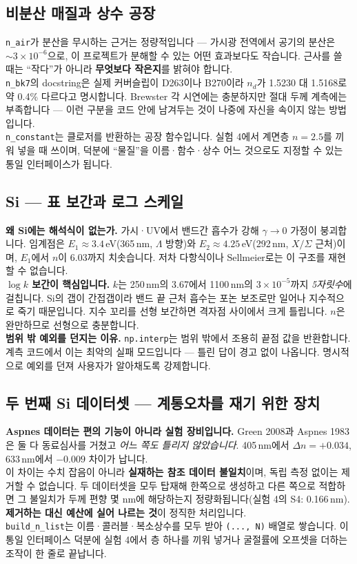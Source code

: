 \documentclass[10pt,a4paper]{article}
\newcommand{\note}[1]{%
  \begin{tcolorbox}[enhanced,breakable,colback=white,colframe=accent,
    boxrule=0pt,leftrule=1.6pt,arc=0pt,outer arc=0pt,
    left=6pt,right=2pt,top=3pt,bottom=3pt,boxsep=0pt,
    before skip=5pt, after skip=8pt]
  #1
  \end{tcolorbox}}
\begin{document}
\subsection{비분산 매질과 상수 공장}

\note{
\texttt{n\_air}가 분산을 무시하는 근거는 정량적입니다 — 가시광 전역에서 공기의 분산은
$\sim3\times10^{-6}$으로, 이 프로젝트가 분해할 수 있는 어떤 효과보다도 작습니다.
근사를 쓸 때는 ``작다''가 아니라 \textbf{무엇보다 작은지}를 밝혀야 합니다.\\[4pt]
\texttt{n\_bk7}의 docstring은 실제 커버슬립이 D263이나 B270이라 $n_d$가 1.5230 대 1.5168로
약 0.4\% 다르다고 명시합니다. Brewster 각 시연에는 충분하지만 절대 두께 계측에는 부족합니다 —
이런 구분을 코드 안에 남겨두는 것이 나중에 자신을 속이지 않는 방법입니다.\\[4pt]
\texttt{n\_constant}는 클로저를 반환하는 공장 함수입니다. 실험 4에서 계면층
$n=2.5$를 끼워 넣을 때 쓰이며, 덕분에 ``물질''을 이름·함수·상수 어느 것으로도
지정할 수 있는 통일 인터페이스가 됩니다.
}
\subsection{Si — 표 보간과 로그 스케일}

\note{
\textbf{왜 Si에는 해석식이 없는가.} 가시·UV에서 밴드간 흡수가 강해 $\gamma\to0$ 가정이
붕괴합니다. 임계점은 $E_1\approx3.4$\,eV(365\,nm, $\Lambda$ 방향)와
$E_2\approx4.25$\,eV(292\,nm, $X/\Sigma$ 근처)이며, $E_1$에서 $n$이 6.03까지 치솟습니다.
저차 다항식이나 Sellmeier로는 이 구조를 재현할 수 없습니다.\\[4pt]
\textbf{$\log k$ 보간이 핵심입니다.} $k$는 250\,nm의 3.67에서 1100\,nm의 $3\times10^{-5}$까지
\emph{5자릿수}에 걸칩니다. Si의 갭이 간접갭이라 밴드 끝 근처 흡수는 포논 보조로만 일어나
지수적으로 죽기 때문입니다. 지수 꼬리를 선형 보간하면 격자점 사이에서 크게 틀립니다.
$n$은 완만하므로 선형으로 충분합니다.\\[4pt]
\textbf{범위 밖 예외를 던지는 이유.} \texttt{np.interp}는 범위 밖에서 조용히 끝점 값을
반환합니다. 계측 코드에서 이는 최악의 실패 모드입니다 — 틀린 답이 경고 없이 나옵니다.
명시적으로 예외를 던져 사용자가 알아채도록 강제합니다.
}
\subsection{두 번째 Si 데이터셋 — 계통오차를 재기 위한 장치}

\note{
\textbf{Aspnes 데이터는 편의 기능이 아니라 실험 장비입니다.} Green 2008과
Aspnes 1983은 둘 다 동료심사를 거쳤고 \emph{어느 쪽도 틀리지 않았습니다}.
405\,nm에서 $\Delta n=+0.034$, 633\,nm에서 $-0.009$ 차이가 납니다.\\[4pt]
이 차이는 수치 잡음이 아니라 \textbf{실재하는 참조 데이터 불일치}이며, 독립 측정 없이는
제거할 수 없습니다. 두 데이터셋을 모두 탑재해 한쪽으로 생성하고 다른 쪽으로 적합하면
그 불일치가 두께 편향 몇 nm에 해당하는지 정량화됩니다(실험 4의 S4: 0.166\,nm).
\textbf{제거하는 대신 예산에 실어 나르는 것}이 정직한 처리입니다.\\[4pt]
\texttt{build\_n\_list}는 이름·콜러블·복소상수를 모두 받아 \texttt{(..., N)} 배열로
쌓습니다. 이 통일 인터페이스 덕분에 실험 4에서 층 하나를 끼워 넣거나 굴절률에
오프셋을 더하는 조작이 한 줄로 끝납니다.
}
\end{document}
